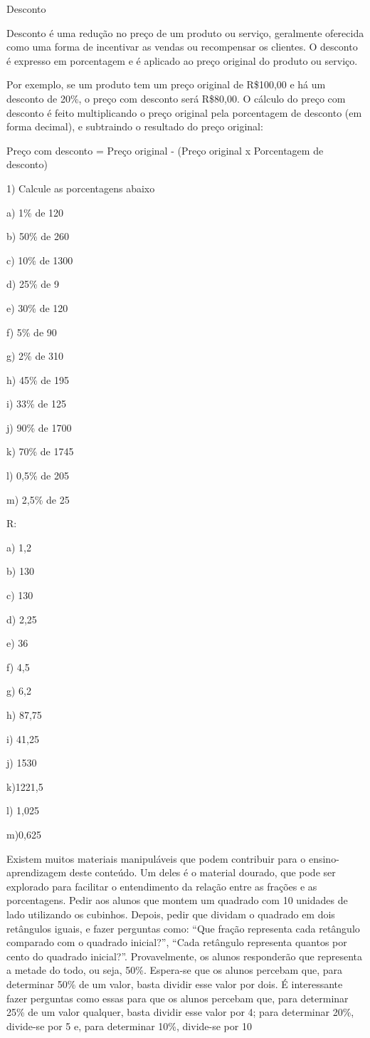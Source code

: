 Desconto

Desconto é uma redução no preço de um produto ou serviço, geralmente
oferecida como uma forma de incentivar as vendas ou recompensar os
clientes. O desconto é expresso em porcentagem e é aplicado ao preço
original do produto ou serviço.

Por exemplo, se um produto tem um preço original de R\$100,00 e há um
desconto de 20\%, o preço com desconto será R\$80,00. O cálculo do preço
com desconto é feito multiplicando o preço original pela porcentagem de
desconto (em forma decimal), e subtraindo o resultado do preço original:

Preço com desconto = Preço original - (Preço original x Porcentagem de
desconto)


1) Calcule as porcentagens abaixo

a) 1\% de 120

b) 50\% de 260

c) 10\% de 1300

d) 25\% de 9

e) 30\% de 120

f) 5\% de 90

g) 2\% de 310

h) 45\% de 195

i) 33\% de 125

j) 90\% de 1700

k) 70\% de 1745

l) 0,5\% de 205

m) 2,5\% de 25

R:

a) 1,2

b) 130

c) 130

d) 2,25

e) 36

f) 4,5

g) 6,2

h) 87,75

i) 41,25

j) 1530

k)1221,5

l) 1,025

m)0,625

Existem muitos materiais manipuláveis que podem contribuir para o
ensino-aprendizagem deste conteúdo. Um deles é o material dourado, que
pode ser explorado para facilitar o entendimento da relação entre as
frações e as porcentagens. Pedir aos alunos que montem um quadrado com
10 unidades de lado utilizando os cubinhos. Depois, pedir que dividam o
quadrado em dois retângulos iguais, e fazer perguntas como: ``Que fração
representa cada retângulo comparado com o quadrado inicial?'', ``Cada
retângulo representa quantos por cento do quadrado inicial?''.
Provavelmente, os alunos responderão que representa a metade do todo, ou
seja, 50\%. Espera-se que os alunos percebam que, para determinar 50\%
de um valor, basta dividir esse valor por dois. É interessante fazer
perguntas como essas para que os alunos percebam que, para determinar
25\% de um valor qualquer, basta dividir esse valor por 4; para
determinar 20\%, divide-se por 5 e, para determinar 10\%, divide-se por
10


